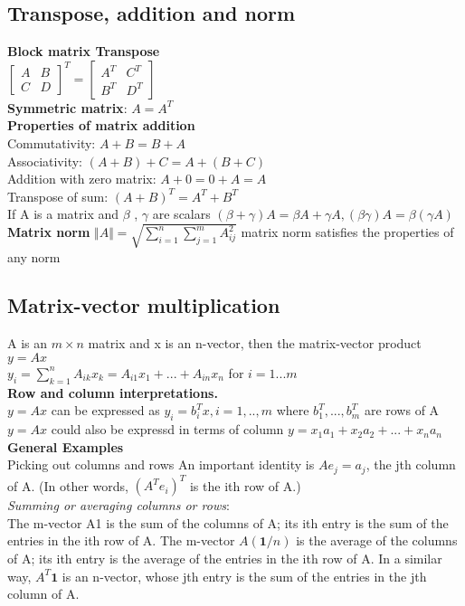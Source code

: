 \subsection{Transpose, addition and norm}
\textbf{Block matrix Transpose}\\
$
\begin{bmatrix}
    A & B \\
    C & D
    
\end{bmatrix}^{T}= 
\begin{bmatrix}
    A^T & C^T \\
    B^T & D^T
\end{bmatrix}
$\\
\textbf{Symmetric matrix}: $A = A^T$\\
\textbf{Properties of matrix addition}\\
\textbullet Commutativity: $A+B=B+A$\\
\textbullet Associativity: $(A + B) + C = A + (B + C)$\\
\textbullet Addition with zero matrix: $A+0=0+A=A$\\
\textbullet Transpose of sum:  $(A+B)^T = A^T +B^T$\\
If A is a matrix and $\beta$ , $\gamma$ are scalars
$(\beta + \gamma)A = \beta A + \gamma A, 
(\beta \gamma)A = \beta(\gamma A)
$\\
\textbf{Matrix norm}
$\Vert A \Vert = \sqrt{\sum_{i=1}^n\sum_{j=1}^m A^2_{ij}}$
matrix norm satisfies the properties of any norm

\subsection{Matrix-vector multiplication}
A is an $m\times n$ matrix and x is an n-vector, then the matrix-vector product $y = Ax$\\

$y_i = \sum_{k=1}^n A_{ik} x_k =A_{i1}x_1 +...+A_{in}x_n$ for $i=1...m$\\
\textbullet \textbf{Row and column interpretations.}\\
$y = Ax$ can be expressed as $y_i=b^T_ix, i=1,..,m$ where $b^T_1,...,b^T_m$ are rows of A\\
\textbullet $y = Ax$ could also be expressd in terms of column
$y = x_1a_1 + x_2a_2 +...+ x_na_n$\\
\textbf{General Examples}\\
\textbullet Picking out columns and rows An important identity is $Ae_j = a_j$, the jth column of A. (In other words, $(A^T e_i)^T$ is the ith row of A.)\\
\textbullet \textit{Summing or  averaging columns or rows}:\\ The m-vector A1 is the sum of the columns of A; its ith entry is the sum of the entries in the ith row of A. The m-vector $A(\textbf{1}/n)$ is the average of the columns of A; its ith entry is the average of the entries in the ith row of A. In a similar way, $A^T \textbf{1}$ is an n-vector, whose jth entry is the sum of the entries in the jth column of A.\\

